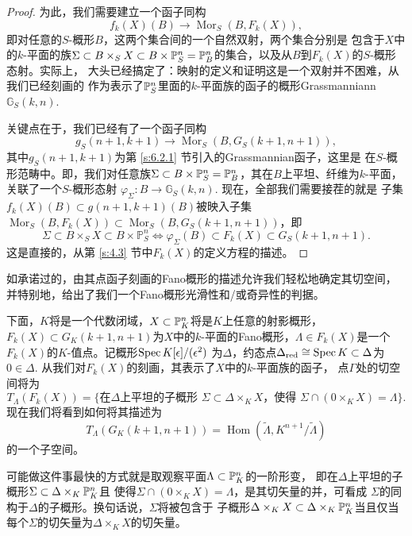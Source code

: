\begin{proof}
为此，我们需要建立一个函子同构
\[
    f_{k}(X)(B) \longrightarrow \operatorname{Mor}_{S}(B, F_{k}(X)),
\]
即对任意的$S$-概形$B$，这两个集合间的一个自然双射，两个集合分别是
包含于$X$中的$k$-平面的族$\Sigma\subset B\times_S X\subset B\times 
\P_S^n=\P_B^n$的集合，以及从$B$到$F_k(X)$的$S$-概形态射。实际上，
大头已经搞定了：映射的定义和证明这是一个双射并不困难，从我们已经刻画的
作为表示了$\P_S^n$里面的$k$-平面族的函子的概形Grassmanniann 
$\mathbb G_S(k,n)$.

关键点在于，我们已经有了一个函子同构
\[
    g_{S}(n+1, k+1) \longrightarrow \operatorname{Mor}_{S}
    (B, G_{S}(k+1, n+1)),
\]
其中$g_S(n+1,k+1)$为第 \ref{s:6.2.1} 节引入的Grassmannian函子，这里是
在$S$-概形范畴中。即，我们对任意族$\Sigma\subset B\times \P_S^n
=\P_B^n$，其在$B$上平坦、纤维为$k$-平面，关联了一个$S$-概形态射
$\varphi_\Sigma:B\to \mathbb G_S(k,n)$. 现在，全部我们需要接茬的就是
子集$f_k(X)(B)\subset g(n+1,k+1)(B)$被映入子集$\operatorname{Mor}_S(B,
F_k(X))\subset \operatorname{Mor}_S(B,G_S(k+1,n+1))$，即
\[
    \Sigma \subset B \times_{S} X \subset B \times \mathbb{P}_{S}^{n} \Longleftrightarrow 
    \varphi_{\Sigma}(B) \subset F_{k}(X) \subset G_{S}(k+1, n+1).
\]
这是直接的，从第 \ref{s:4.3} 节中$F_k(X)$的定义方程的描述。
\end{proof}

如承诺过的，由其点函子刻画的Fano概形的描述允许我们轻松地确定其切空间，
并特别地，给出了我们一个Fano概形光滑性和/或奇异性的判据。

下面，$K$将是一个代数闭域，$X\subset \P_K^n$将是$K$上任意的射影概形，
$F_k(X)\subset G_K(k+1,n+1)$为$X$中的$k$-平面的Fano概形，$\Lambda\in
F_k(X)$是一个$F_k(X)$的$K$-值点。记概形$\spec K[\epsilon]/(\epsilon^2)$
为$\Delta$，约态点$\Delta_{\text{red}}\cong \spec K\subset \Delta$为
$0\in \Delta$. 从我们对$F_k(X)$的刻画，其表示了$X$中的$k$-平面族的函子，
点$\Gamma$处的切空间将为
\[
    T_\Lambda(F_k(X))=\{\text{在$\Delta$上平坦的子概形
    $\Sigma\subset \Delta\times_K X$，使得
    $\Sigma\cap (0\times_K X)=\Lambda$}\}.
\]
现在我们将看到如何将其描述为
\[
    T_{\Lambda}(G_{K}(k+1, n+1))=\operatorname{Hom}
    (\tilde{\Lambda}, K^{n+1} / \tilde{\Lambda})
\]
的一个子空间。

可能做这件事最快的方式就是取观察平面$\Lambda\subset \P_K^n$的一阶形变，
即在$\Delta$上平坦的子概形$\Sigma\subset \Delta\times_K \P_K^n$且
使得$\Sigma\cap (0\times_K X)=\Lambda$，是其切矢量的并，可看成
$\Sigma$的同构于$\Delta$的子概形。换句话说，$\Sigma$将被包含于
子概形$\Delta\times_K X\subset \Delta\times_K \P_K^n$当且仅当
每个$\Sigma$的切矢量为$\Delta\times_K X$的切矢量。

